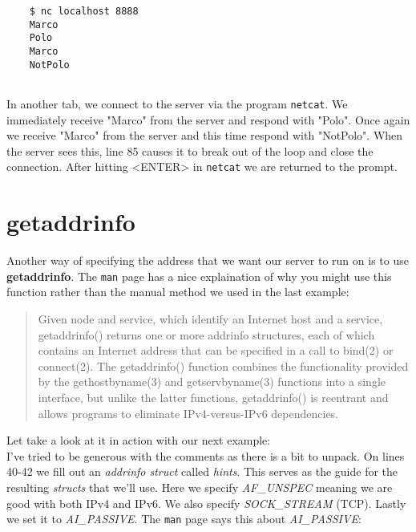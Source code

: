 \documentclass[../main.tex]{subfiles}
\begin{document}
	\begin{verbatim}
	$ nc localhost 8888
	Marco
	Polo
	Marco
	NotPolo
	
	\end{verbatim}
	
	In another tab, we connect to the server via the program \texttt{netcat}.  We immediately receive "Marco" from the server and respond with "Polo".  Once again we receive "Marco" from the server and this time respond with "NotPolo".  When the server sees this, line 85 causes it to break out of the loop and close the connection.  After hitting <ENTER> in \texttt{netcat} we are returned to the prompt.
	
	\section{getaddrinfo}
	Another way of specifying the address that we want our server to run on is to use \textbf{getaddrinfo}.  The \texttt{man} page has a nice explaination of why you might use this function rather than the manual method we used in the last example:
	
	\begin{quotation}
		Given node and service, which identify an Internet host and a service, getaddrinfo() returns one or more addrinfo structures, each of which contains an Internet address that can be specified in a call to bind(2) or connect(2).  The getaddrinfo() function combines the
		functionality provided by the gethostbyname(3) and getservbyname(3) functions into a single interface, but unlike the latter functions, getaddrinfo() is reentrant and allows programs to eliminate IPv4-versus-IPv6 dependencies.
	\end{quotation}

	Let take a look at it in action with our next example:\\
	
	
	
	I've tried to be generous with the comments as there is a bit to unpack.  On lines 40-42 we fill out an \textit{addrinfo struct} called \textit{hints}.  This serves as the guide for the resulting \textit{structs} that we'll use.  Here we specify \textit{AF\_UNSPEC} meaning we are good with both IPv4 and IPv6.  We also specify \textit{SOCK\_STREAM} (TCP).  Lastly we set it to \textit{AI\_PASSIVE}.  The \texttt{man} page says this about \textit{AI\_PASSIVE}:
	
\end{document}
